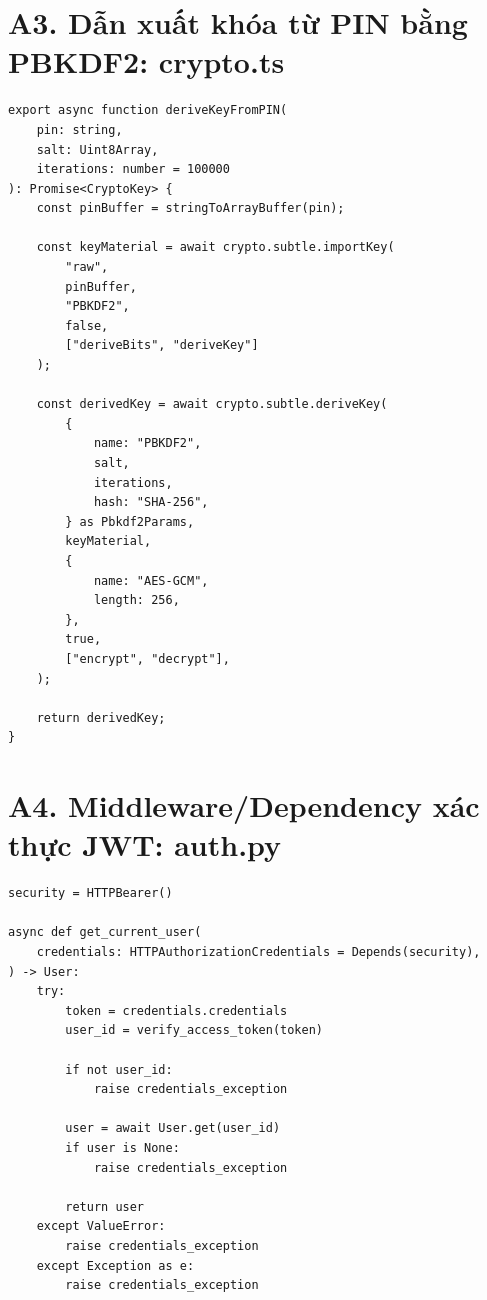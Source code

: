 \section*{A3. Dẫn xuất khóa từ PIN bằng PBKDF2: crypto.ts}

\begin{verbatim}
export async function deriveKeyFromPIN(
    pin: string,
    salt: Uint8Array,
    iterations: number = 100000
): Promise<CryptoKey> {
    const pinBuffer = stringToArrayBuffer(pin);

    const keyMaterial = await crypto.subtle.importKey(
        "raw",
        pinBuffer,
        "PBKDF2",
        false,
        ["deriveBits", "deriveKey"]
    );

    const derivedKey = await crypto.subtle.deriveKey(
        {
            name: "PBKDF2",
            salt,
            iterations,
            hash: "SHA-256",
        } as Pbkdf2Params,
        keyMaterial,
        {
            name: "AES-GCM",
            length: 256,
        },
        true,
        ["encrypt", "decrypt"],
    );

    return derivedKey;
}
\end{verbatim}

\section*{A4. Middleware/Dependency xác thực JWT: auth.py}

\begin{verbatim}
security = HTTPBearer()

async def get_current_user(
    credentials: HTTPAuthorizationCredentials = Depends(security),
) -> User:
    try:
        token = credentials.credentials
        user_id = verify_access_token(token)

        if not user_id:
            raise credentials_exception

        user = await User.get(user_id)
        if user is None:
            raise credentials_exception

        return user
    except ValueError:
        raise credentials_exception
    except Exception as e:
        raise credentials_exception
\end{verbatim}

